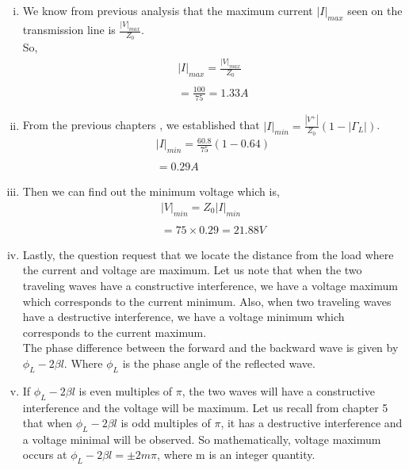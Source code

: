 \begin{example}
\begin{enumerate}[(i)]
\item We know from previous analysis that the maximum current $|I|_{max}$ seen on the transmission line is $\frac{|V|_{max}}{Z_0}$.\\
So,
\begin{align*}
|I|_{max}=\frac{|V|_{max}}{Z_0}\\\\
=\frac{100}{75}=1.33A
\end{align*}

\item From the previous chapters , we established that $|I|_{min}=\frac{|V^{+}|}{Z_0}(1-|\Gamma_{L}|)$.
\begin{align*}
|I|_{min}=\frac{60.8}{75}(1-0.64)\\\\
=0.29A
\end{align*}

\item Then we can find out the minimum voltage which is,	
\begin{align*}
|V|_{min}=Z_0|I|_{min}\\\\
=75\times0.29=21.88V
\end{align*}

\item Lastly, the question request that we locate the distance from the load where the current and voltage are maximum. Let us note that when the two traveling waves have a constructive interference, we have a voltage maximum which corresponds to the current minimum. Also, when two traveling waves have a destructive interference, we have a voltage minimum which corresponds to the current maximum.\\
The phase difference between the forward and the backward wave is given by $\phi_{L}-2\beta l$. Where $\phi_L$ is the phase angle of the reflected wave.

\item If $\phi_{L}-2\beta l$ is even multiples of $\pi$, the two waves will  have a constructive interference and the voltage will be maximum. Let us recall from chapter 5 that when $\phi_{L}-2\beta l$ is odd multiples of $\pi$, it has a destructive interference and a voltage minimal will be observed. So mathematically, voltage maximum occurs at $\phi_{L}-2\beta l= \pm2m\pi$, where m is an integer quantity.


\end{enumerate}
\end{example}
